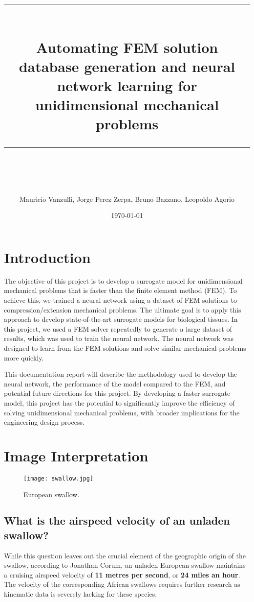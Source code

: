 \documentclass[11pt]{scrartcl} %
\title{	
	\normalfont\normalsize
	\textsc{}\\ %
	\vspace{25pt} %
	\rule{\linewidth}{0.5pt}\\ %
	\vspace{20pt} %
	{\huge Automating FEM solution database generation and neural network learning for unidimensional mechanical problems}\\ %
	\vspace{12pt} %
	\rule{\linewidth}{2pt}\\ %
	\vspace{12pt} %
}
\author{\Large Mauricio Vanzulli, Jorge Perez Zerpa, Bruno Bazzano, Leopoldo Agorio} %
\date{\normalsize\today} %
\begin{document}
\maketitle %


\section{Introduction}
The objective of this project is to develop a surrogate model for unidimensional mechanical problems that is faster than the finite element method (FEM). To achieve this, we trained a neural network using a dataset of FEM solutions to compression/extension mechanical problems. The ultimate goal is to apply this approach to develop state-of-the-art surrogate models for biological tissues. In this project, we used a FEM solver repeatedly to generate a large dataset of results, which was used to train the neural network. The neural network was designed to learn from the FEM solutions and solve similar mechanical problems more quickly. 

This documentation report will describe the methodology used to develop the neural network, the performance of the model compared to the FEM, and potential future directions for this project. By developing a faster surrogate model, this project has the potential to significantly improve the efficiency of solving unidimensional mechanical problems, with broader implications for the engineering design process.

\section{Image Interpretation}

\begin{figure}[h] %
	\centering
	\texttt{[image: swallow.jpg]} %
	\caption{European swallow.}
\end{figure}


\subsection{What is the airspeed velocity of an unladen swallow?}

While this question leaves out the crucial element of the geographic origin of the swallow, according to Jonathan Corum, an unladen European swallow maintains a cruising airspeed velocity of \textbf{11 metres per second}, or \textbf{24 miles an hour}. The velocity of the corresponding African swallows requires further research as kinematic data is severely lacking for these species.
\end{document}
